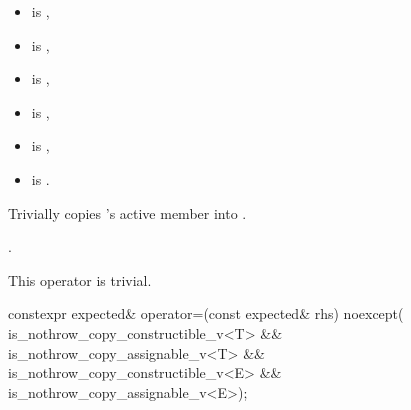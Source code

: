 \begin{itemdescr}
\pnum
\constraints
\begin{itemize}
\item {} is ,
\item {} is ,
\item {} is ,
\item {} is ,
\item {} is ,
\item {} is .
\end{itemize}

\pnum
\effects
Trivially copies 's active member into .

\pnum
\returns
{}.

\pnum
\remarks
This operator is trivial.
\end{itemdescr}

%
\begin{itemdecl}
constexpr expected& operator=(const expected& rhs) noexcept(
    is_nothrow_copy_constructible_v<T> && is_nothrow_copy_assignable_v<T> &&
    is_nothrow_copy_constructible_v<E> && is_nothrow_copy_assignable_v<E>);
\end{itemdecl}


